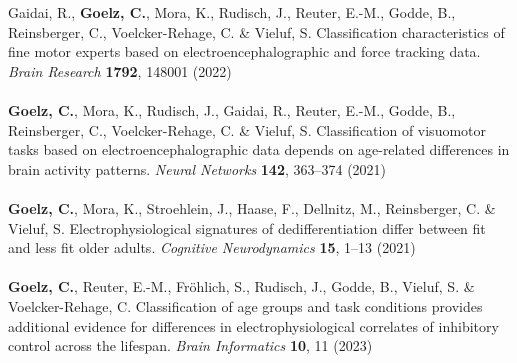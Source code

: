 Gaidai, R., \textbf{Goelz, C.}, Mora, K., Rudisch, J., Reuter, E.-M., Godde, B., Reinsberger, C., Voelcker-Rehage, C. \& Vieluf, S. Classification characteristics of fine motor experts based on electroencephalographic and force tracking data. \textit{Brain Research} \textbf{1792}, 148001 (2022)\\
\\
\textbf{Goelz, C.}, Mora, K., Rudisch, J., Gaidai, R., Reuter, E.-M., Godde, B., Reinsberger, C., Voelcker-Rehage, C. \& Vieluf, S. Classification of visuomotor tasks based on electroencephalographic data depends on age-related differences in brain activity patterns. \textit{Neural Networks} \textbf{142}, 363--374 (2021)\\
\\
\textbf{Goelz, C.}, Mora, K., Stroehlein, J., Haase, F., Dellnitz, M., Reinsberger, C. \& Vieluf, S. Electrophysiological signatures of dedifferentiation differ between fit and less fit older adults. \textit{Cognitive Neurodynamics} \textbf{15}, 1--13 (2021)\\
\\
\textbf{Goelz, C.}, Reuter, E.-M., Fröhlich, S., Rudisch, J., Godde, B., Vieluf, S. \& Voelcker-Rehage, C. Classification of age groups and task conditions provides additional evidence for differences in electrophysiological correlates of inhibitory control across the lifespan. \textit{Brain Informatics} \textbf{10}, 11 (2023)